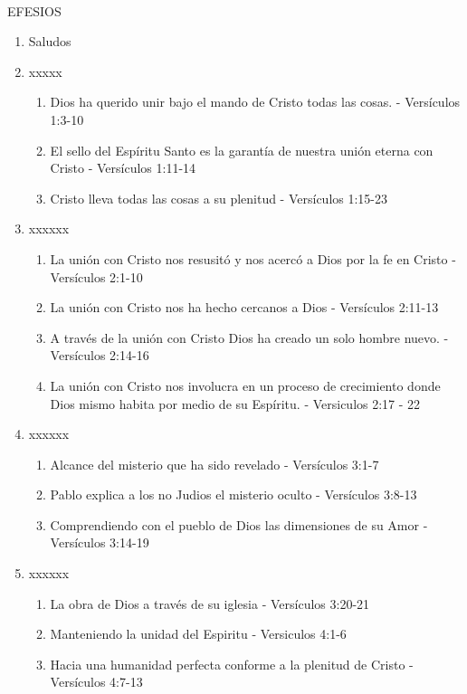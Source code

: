 \documentclass[9pt,letterpaper]{article}
\author{Ciencias}
\begin{document}
	\\
	{\large EFESIOS}\\
	
	\begin{enumerate}
		\item Saludos
		\item  xxxxx
		\begin{enumerate}
			\item Dios ha querido unir bajo el mando de Cristo todas las cosas. - Versículos 1:3-10
			\item El sello del Espíritu Santo es la garantía de nuestra unión eterna con Cristo - Versículos 1:11-14
			\item Cristo lleva todas las cosas a su plenitud - Versículos 1:15-23
		\end{enumerate}
		\item xxxxxx
		\begin{enumerate}
			\item La unión con Cristo nos resusitó y nos acercó a Dios por la fe en Cristo - Versículos 2:1-10
			\item La unión con Cristo nos ha hecho cercanos a Dios - Versículos 2:11-13
			\item A través de la unión con Cristo Dios ha creado un solo hombre nuevo. - Versículos 2:14-16
			\item La unión con Cristo nos involucra en un proceso de crecimiento donde Dios mismo habita por medio de su Espíritu. - Versiculos 2:17 - 22
		\end{enumerate}
		\item xxxxxx
		\begin{enumerate}
			\item Alcance del misterio que ha sido revelado - Versículos 3:1-7
			\item Pablo explica a los no Judios el misterio oculto - Versículos 3:8-13
			\item Comprendiendo con el pueblo de Dios las dimensiones de su Amor - Versículos 3:14-19
		\end{enumerate}
		\item xxxxxx
		\begin{enumerate}
			\item La obra de Dios a través de su iglesia - Versículos 3:20-21
			\item Manteniendo la unidad del Espiritu - Versiculos 4:1-6			 
			\item Hacia una humanidad perfecta conforme a la plenitud de Cristo - Versículos 4:7-13

\end{enumerate}
\end{enumerate}
\end{document}
